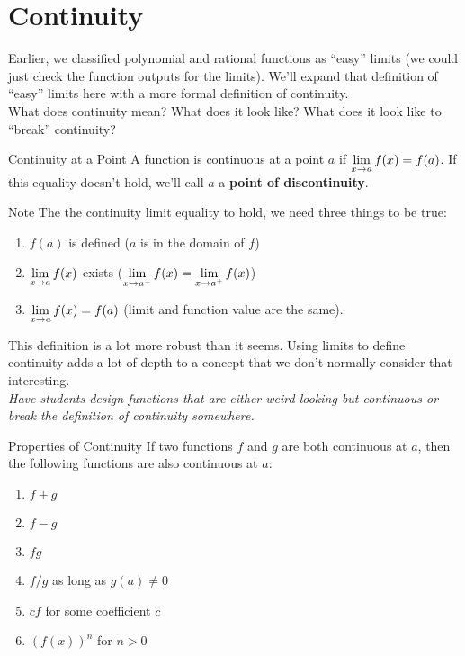 \section{Continuity}

Earlier, we classified polynomial and rational functions as ``easy'' limits (we could just check the function outputs for the limits). We'll expand that definition of ``easy'' limits here with a more formal definition of continuity.\\

What does continuity mean? What does it look like? What does it look like to ``break'' continuity?

\begin{defn}{Continuity at a Point}
A function is continuous at a point $a$ if $\displaystyle \lim_{x\to a}f(x) = f(a)$. If this equality doesn't hold, we'll call $a$ a \textbf{point of discontinuity}.
\end{defn}

\begin{note}{Note}
The the continuity limit equality to hold, we need three things to be true:
\begin{enumerate}
  \item $f(a)$ is defined ($a$ is in the domain of $f$)
  \item $\displaystyle \lim_{x\to a}f(x)$ exists ($\displaystyle \lim_{x\to a^-} f(x) = \displaystyle \lim_{x\to a^+} f(x)$)
  \item $\displaystyle \lim_{x\to a}f(x) = f(a)$ (limit and function value are the same).
\end{enumerate}
\end{note}

This definition is a lot more robust than it seems. Using limits to define continuity adds a lot of depth to a concept that we don't normally consider that interesting.\\

\textit{Have students design functions that are either weird looking but continuous or break the definition of continuity somewhere.}

\begin{thm}{Properties of Continuity}
If two functions $f$ and $g$ are both continuous at $a$, then the following functions are also continuous at $a$:
  \begin{enumerate}
    \item $f+g$
    \item $f-g$
    \item $fg$
    \item $f/g$ as long as $g(a)\neq 0$
    \item $cf$ for some coefficient $c$
    \item $(f(x))^n$ for $n>0$
  \end{enumerate}
\end{thm}

